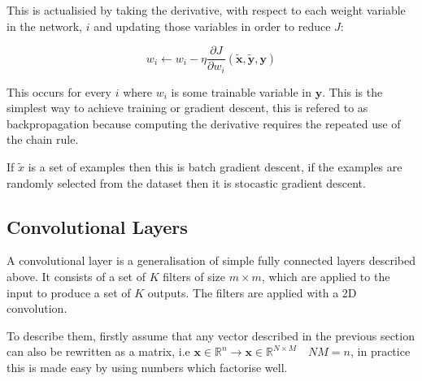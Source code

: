       This is actualisied by taking the derivative, with respect to each weight variable
      in the network, $i$ and updating those variables in order to reduce $J$:

      \begin{equation}
        w_i \leftarrow w_i - \eta \frac{\partial J }{\partial w_{i}}(\tilde{\mathbf{x}},\tilde{\mathbf{y}},\mathbf{y})
      \end{equation}

      This occurs for every $i$ where $w_i$ is some trainable variable in $\mathbf{y}$.
      This is the simplest way to achieve training or gradient descent, this is refered to as backpropagation
      because computing the derivative requires the repeated use of the chain rule.

      If $\tilde{x}$ is a set of examples then this is batch gradient descent, if the examples
      are randomly selected from the dataset then it is stocastic gradient descent.




  \subsection{Convolutional Layers}
    A convolutional layer is a generalisation of simple fully connected layers described
    above. It consists of a set of $K$ filters of size $m\times m$, which are applied to the input to produce
    a set of $K$ outputs. The filters are applied with a 2D convolution.


    To describe them, firstly assume that any vector described in the previous section
    can also be rewritten as a matrix, i.e $\mathbf{x} \in \mathbb{R}^{n}
    \rightarrow \mathbf{x} \in \mathbb{R}^{N \times M} \quad NM=n$, in practice this is made
    easy by using numbers which factorise well.

